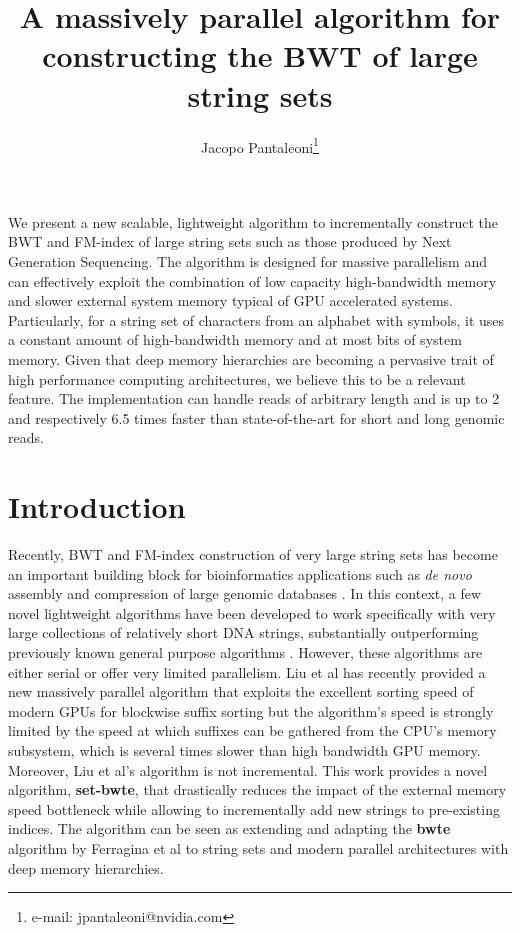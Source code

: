 \documentclass{acmsiggraph}
\title{A massively parallel algorithm for constructing the BWT of large string sets}
\author{Jacopo Pantaleoni\thanks{e-mail: jpantaleoni@nvidia.com}}
\begin{document}
\newcommand{\picresdir}{final}




\maketitle



\abstract

We present a new scalable, lightweight algorithm to incrementally construct the BWT and FM-index of large string sets such as those produced by Next Generation Sequencing.
The algorithm is designed for massive parallelism and can effectively exploit the combination of low capacity high-bandwidth memory and slower external system memory typical of GPU accelerated systems. Particularly, for a string set of  characters from an alphabet with  symbols, it uses a constant amount of high-bandwidth memory and at most  bits of system memory. Given that deep memory hierarchies are becoming a pervasive trait of high performance computing architectures, we believe this to be a relevant
feature.
The implementation can handle reads of arbitrary length and is up to 2 and respectively 6.5 times faster than state-of-the-art for short and long genomic reads.

\section{Introduction}

Recently, BWT and FM-index construction of very large string sets has become an important building block for bioinformatics applications such as \emph{de novo} assembly \cite{Simpson:2011} and compression of large genomic databases \cite{Cox:2012}.
In this context, a few novel lightweight algorithms have been developed to work specifically with very large collections of relatively short DNA strings, substantially outperforming previously known general purpose algorithms \cite{Bauer:2011,Li:2014}.
However, these algorithms are either serial or offer very limited parallelism.
Liu et al  has recently provided a new massively parallel algorithm that exploits the excellent sorting speed of modern GPUs for blockwise suffix sorting \cite{Karkkainen:2007} but the algorithm's speed is strongly limited by the speed at which suffixes can be gathered from the CPU's memory subsystem, which is several times slower than high bandwidth GPU memory. Moreover, Liu et al's  algorithm is not incremental.
This work provides a novel algorithm, {\bf set-bwte}, that drastically reduces the impact of the external
memory speed bottleneck while allowing to incrementally add new strings to pre-existing indices.
The algorithm can be seen as extending and adapting the {\bf bwte} algorithm by Ferragina et al  to string sets and modern parallel architectures with deep memory hierarchies.
\end{document}
